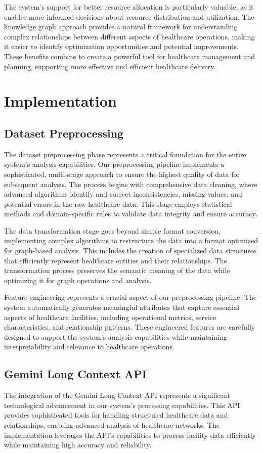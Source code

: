 \documentclass[12pt,a4paper]{report}
\begin{document}
The system's support for better resource allocation is particularly valuable, as it enables more informed decisions about resource distribution and utilization. The knowledge graph approach provides a natural framework for understanding complex relationships between different aspects of healthcare operations, making it easier to identify optimization opportunities and potential improvements. These benefits combine to create a powerful tool for healthcare management and planning, supporting more effective and efficient healthcare delivery.

\chapter{Implementation}
\section{Dataset Preprocessing}
The dataset preprocessing phase represents a critical foundation for the entire system's analysis capabilities. Our preprocessing pipeline implements a sophisticated, multi-stage approach to ensure the highest quality of data for subsequent analysis. The process begins with comprehensive data cleaning, where advanced algorithms identify and correct inconsistencies, missing values, and potential errors in the raw healthcare data. This stage employs statistical methods and domain-specific rules to validate data integrity and ensure accuracy.

The data transformation stage goes beyond simple format conversion, implementing complex algorithms to restructure the data into a format optimized for graph-based analysis. This includes the creation of specialized data structures that efficiently represent healthcare entities and their relationships. The transformation process preserves the semantic meaning of the data while optimizing it for graph operations and analysis.

Feature engineering represents a crucial aspect of our preprocessing pipeline. The system automatically generates meaningful attributes that capture essential aspects of healthcare facilities, including operational metrics, service characteristics, and relationship patterns. These engineered features are carefully designed to support the system's analysis capabilities while maintaining interpretability and relevance to healthcare operations.

\section{Gemini Long Context API}
The integration of the Gemini Long Context API represents a significant technological advancement in our system's processing capabilities. This API provides sophisticated tools for handling structured healthcare data and relationships, enabling advanced analysis of healthcare networks. The implementation leverages the API's capabilities to process facility data efficiently while maintaining high accuracy and reliability.
\end{document}
